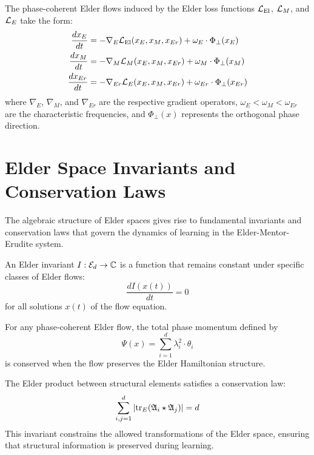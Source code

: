 \begin{corollary}
The phase-coherent Elder flows induced by the Elder loss functions $\mathcal{L}_{\text{El}}$, $\mathcal{L}_M$, and $\mathcal{L}_E$ take the form:
\begin{align}
\frac{dx_E}{dt} &= -\nabla_E \mathcal{L}_{\text{El}}(x_E, x_M, x_{Er}) + \omega_E \cdot \Phi_{\perp}(x_E)\\
\frac{dx_M}{dt} &= -\nabla_M \mathcal{L}_M(x_E, x_M, x_{Er}) + \omega_M \cdot \Phi_{\perp}(x_M)\\
\frac{dx_{Er}}{dt} &= -\nabla_{Er} \mathcal{L}_E(x_E, x_M, x_{Er}) + \omega_{Er} \cdot \Phi_{\perp}(x_{Er})
\end{align}
where $\nabla_E$, $\nabla_M$, and $\nabla_{Er}$ are the respective gradient operators, $\omega_E < \omega_M < \omega_{Er}$ are the characteristic frequencies, and $\Phi_{\perp}(x)$ represents the orthogonal phase direction.
\end{corollary}

\section{Elder Space Invariants and Conservation Laws}

The algebraic structure of Elder spaces gives rise to fundamental invariants and conservation laws that govern the dynamics of learning in the Elder-Mentor-Erudite system.

\begin{definition}
An Elder invariant $I: \mathcal{E}_{d} \rightarrow \mathbb{C}$ is a function that remains constant under specific classes of Elder flows:
\begin{equation}
\frac{dI(x(t))}{dt} = 0
\end{equation}
for all solutions $x(t)$ of the flow equation.
\end{definition}

\begin{theorem}
For any phase-coherent Elder flow, the total phase momentum defined by
\begin{equation}
\Psi(x) = \sum_{i=1}^{d} \lambda_i^2 \cdot \theta_i
\end{equation}
is conserved when the flow preserves the Elder Hamiltonian structure.
\end{theorem}

\begin{theorem}
The Elder product between structural elements satisfies a conservation law:
\begin{equation}
\sum_{i,j=1}^{d} |\mathrm{tr}_E(\mathfrak{A}_{i} \star \mathfrak{A}_{j})| = d
\end{equation}
This invariant constrains the allowed transformations of the Elder space, ensuring that structural information is preserved during learning.
\end{theorem}

